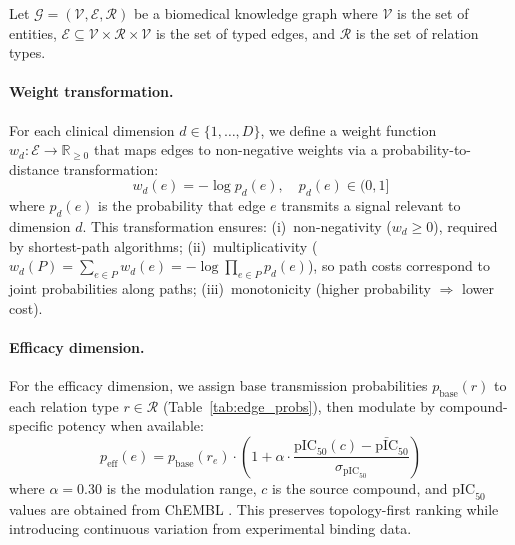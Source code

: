 \documentclass[11pt,a4paper]{article}
\begin{document}
Let $\mathcal{G} = (\mathcal{V}, \mathcal{E}, \mathcal{R})$ be a
biomedical knowledge graph where $\mathcal{V}$ is the set of entities,
$\mathcal{E} \subseteq \mathcal{V} \times \mathcal{R} \times
\mathcal{V}$ is the set of typed edges, and $\mathcal{R}$ is the set
of relation types.

\paragraph{Weight transformation.}
For each clinical dimension $d \in \{1, \ldots, D\}$, we define a
weight function $w_d: \mathcal{E} \to \mathbb{R}_{\geq 0}$ that maps
edges to non-negative weights via a probability-to-distance
transformation:
\begin{equation}
    w_d(e) = -\log p_d(e), \quad p_d(e) \in (0, 1]
    \label{eq:weight}
\end{equation}
where $p_d(e)$ is the probability that edge $e$ transmits a signal
relevant to dimension $d$. This transformation ensures:
(i)~non-negativity ($w_d \geq 0$), required by shortest-path
algorithms;
(ii)~multiplicativity ($w_d(P) = \sum_{e \in P} w_d(e) =
-\log \prod_{e \in P} p_d(e)$), so path costs correspond to
joint probabilities along paths;
(iii)~monotonicity (higher probability $\Rightarrow$ lower cost).

\paragraph{Efficacy dimension.}
For the efficacy dimension, we assign base transmission probabilities
$p_\text{base}(r)$ to each relation type $r \in \mathcal{R}$
(Table~\ref{tab:edge_probs}), then modulate by compound-specific
potency when available:
\begin{equation}
    p_\text{eff}(e) = p_\text{base}(r_e) \cdot
    \left(1 + \alpha \cdot \frac{\text{pIC}_{50}(c) -
    \bar{\text{pIC}}_{50}}{\sigma_{\text{pIC}_{50}}}\right)
    \label{eq:efficacy}
\end{equation}
where $\alpha = 0.30$ is the modulation range, $c$ is the source
compound, and $\text{pIC}_{50}$ values are obtained from ChEMBL
\citep{gaulton2017chembl}. This preserves topology-first ranking
while introducing continuous variation from experimental binding data.
\end{document}
